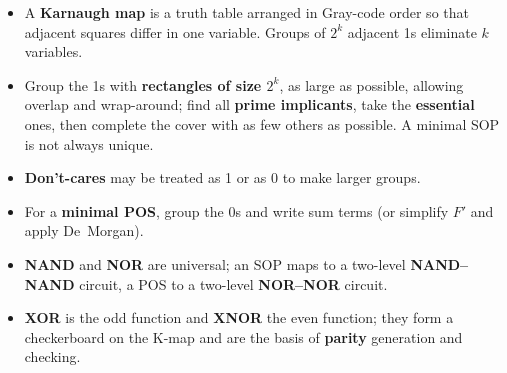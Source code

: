 \begin{chaptersummary}
\begin{itemize}
  \item A \textbf{Karnaugh map} is a truth table arranged in Gray-code order so that adjacent squares differ in one variable. Groups of $2^k$ adjacent 1s eliminate $k$ variables.
  \item Group the 1s with \textbf{rectangles of size $2^k$}, as large as possible, allowing overlap and wrap-around; find all \textbf{prime implicants}, take the \textbf{essential} ones, then complete the cover with as few others as possible. A minimal SOP is not always unique.
  \item \textbf{Don't-cares} may be treated as 1 or as 0 to make larger groups.
  \item For a \textbf{minimal POS}, group the 0s and write sum terms (or simplify $F'$ and apply De~Morgan).
  \item \textbf{NAND} and \textbf{NOR} are universal; an SOP maps to a two-level \textbf{NAND--NAND} circuit, a POS to a two-level \textbf{NOR--NOR} circuit.
  \item \textbf{XOR} is the odd function and \textbf{XNOR} the even function; they form a checkerboard on the K-map and are the basis of \textbf{parity} generation and checking.
\end{itemize}
\end{chaptersummary}

